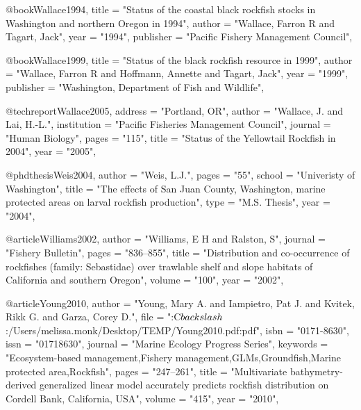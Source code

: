 @book{Wallace1994,
    title = "{Status of the coastal black rockfish stocks in Washington and northern Oregon in 1994}",
    author = "{Wallace, Farron R and Tagart, Jack}",
    year = "{1994}",
    publisher = "{Pacific Fishery Management Council}",
}

@book{Wallace1999,
    title = "{Status of the black rockfish resource in 1999}",
    author = "{Wallace, Farron R and Hoffmann, Annette and Tagart, Jack}",
    year = "{1999}",
    publisher = "{Washington, Department of Fish and Wildlife}",
}

@techreport{Wallace2005,
    address = "{Portland, OR}",
    author = "{Wallace, J. and Lai, H.-L.}",
    institution = "{Pacific Fisheries Management Council}",
    journal = "{Human Biology}",
    pages = "{115}",
    title = "{{Status of the Yellowtail Rockfish in 2004}}",
    year = "{2005}",
}

@phdthesis{Weis2004,
    author = "{Weis, L.J.}",
    pages = "{55}",
    school = "{Univeristy of Washington}",
    title = "{{The effects of San Juan County, Washington, marine protected areas on larval rockfish production}}",
    type = "{M.S. Thesis}",
    year = "{2004}",
}

@article{Williams2002,
    author = "{Williams, E H and Ralston, S}",
    journal = "{Fishery Bulletin}",
    pages = "{836--855}",
    title = "{{Distribution and co-occurrence of rockfishes (family: Sebastidae) over trawlable shelf and slope habitats of California and southern Oregon}}",
    volume = "{100}",
    year = "{2002}",
}

@article{Young2010,
    author = "{Young, Mary A. and Iampietro, Pat J. and Kvitek, Rikk G. and Garza, Corey D.}",
    file = "{:C$\\backslash$:/Users/melissa.monk/Desktop/TEMP/Young2010.pdf:pdf}",
    isbn = "{0171-8630}",
    issn = "{01718630}",
    journal = "{Marine Ecology Progress Series}",
    keywords = "{Ecosystem-based management,Fishery management,GLMs,Groundfish,Marine protected area,Rockfish}",
    pages = "{247--261}",
    title = "{{Multivariate bathymetry-derived generalized linear model accurately predicts rockfish distribution on Cordell Bank, California, USA}}",
    volume = "{415}",
    year = "{2010}",
}
